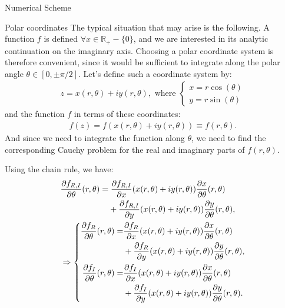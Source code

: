 \begin{section}{Numerical Scheme}
  \begin{subsection}{Polar coordinates}
    The typical situation that may arise is the following. A function
    $f$ is defined $\forall x\in\mathbb{R}_+-\{0\}$, and we are
    interested in its analytic continuation on the imaginary axis.
    Choosing a polar coordinate system
    is therefore convenient, since it would be sufficient to
    integrate along the polar angle $\theta\in[0,\pm\pi/2]$.  Let's
    define such a coordinate system by:
    \begin{align}
      z = x(r,\theta) +iy(r,\theta),\text{ where } \left\{
      \begin{aligned}
        x = r\cos(\theta)\\
        y = r\sin(\theta)          
      \end{aligned}
      \right.
    \end{align}
    and the function $f$ in terms of these coordinates:
    \begin{align}
      f(z) = f(x(r,\theta)+iy(r,\theta)) \equiv f(r,\theta).
    \end{align}
    And since we need to integrate the function along $\theta$, we
    need to find the corresponding Cauchy problem for the real and
    imaginary parts of $f(r,\theta)$.
      
      Using the chain rule, we have:
      \begin{align}
        &\frac{\partial f_{R,I}}{\partial \theta}(r,\theta) = \frac{\partial f_{R,I}}{\partial x}(x(r,\theta)+iy(r,\theta))\frac{\partial x}{\partial \theta}(r,\theta)\\
        &\hphantom{\frac{\partial f_{R,I}}{\partial \theta}(r,\theta) = }+ \frac{\partial f_{R,I}}{\partial y}(x(r,\theta)+iy(r,\theta))\frac{\partial y}{\partial \theta}(r,\theta),\\
        &\Rightarrow \left\{
        \begin{aligned}
          \frac{\partial f_{R}}{\partial \theta}(r,\theta) =& \frac{\partial f_{R}}{\partial x}(x(r,\theta)+iy(r,\theta))\frac{\partial x}{\partial \theta}(r,\theta) \\
          &+ \frac{\partial f_{R}}{\partial y}(x(r,\theta)+iy(r,\theta))\frac{\partial y}{\partial \theta}(r,\theta),\\
          \frac{\partial f_{I}}{\partial \theta}(r,\theta) =& \frac{\partial f_{I}}{\partial x}(x(r,\theta)+iy(r,\theta))\frac{\partial x}{\partial \theta}(r,\theta) \\
          &+ \frac{\partial f_{I}}{\partial y}(x(r,\theta)+iy(r,\theta))\frac{\partial y}{\partial \theta}(r,\theta).
        \end{aligned}
        \right.
      \end{align}


\end{subsection}
\end{section}
